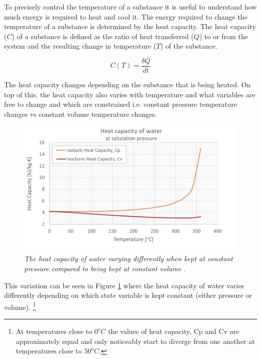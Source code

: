 \documentclass[10pt]{article}
\begin{document}
To precisely control the temperature of a substance it is useful to understand how much energy is required to heat and cool it. The energy required to change the temperature of a substance is determined by the heat capacity. The heat capacity ($C$) of a substance is defined as the ratio of heat transferred ($Q$) to or from the system and the resulting change in temperature ($T$) of the substance.  %

\begin{equation}\label{eq:heat_cap}
    C(T) = \frac{\delta Q}{dt}
\end{equation}

The heat capacity changes depending on the substance that is being heated. On top of this, the heat capacity also varies with temperature and what variables are free to change and which are constrained i.e. constant pressure temperature changes vs constant volume temperature changes.\\

\begin{figure}[h!]
    \centering
    \includegraphics[scale=.75]{Heat_capacity_C.jpg}
    \caption{\it{The heat capacity of water varying differently when kept at constant pressure compared to being kept at constant volume \cite{heat_cap}.}}
    \label{fig:heat_cap_water}
\end{figure}

This variation can be seen in Figure \ref{fig:heat_cap_water} where the heat capacity of water varies differently depending on which state variable is kept constant (either pressure or volume). \footnote{At temperatures close to $0^oC$ the values of heat capacity, Cp and Cv are approximately equal and only noticeably start to diverge from one another at temperatures close to $50^oC$.}\\
\end{document}

